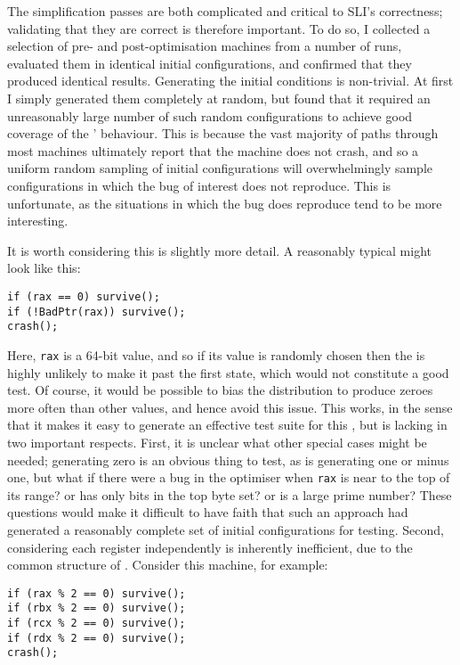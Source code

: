 The \StateMachine simplification passes are both complicated and
critical to SLI's correctness; validating that they are correct is
therefore important.  To do so, I collected a selection of pre- and
post-optimisation machines from a number of runs, evaluated them in
identical initial configurations, and confirmed that they produced
identical results.  Generating the initial conditions is non-trivial.
At first I simply generated them completely at random, but found that
it required an unreasonably large number of such random configurations
to achieve good coverage of the \StateMachines' behaviour.  This is
because the vast majority of paths through most machines ultimately
report that the machine does not crash, and so a uniform random
sampling of initial configurations will overwhelmingly sample
configurations in which the bug of interest does not reproduce.  This
is unfortunate, as the situations in which the bug does reproduce tend
to be more interesting.

It is worth considering this is slightly more detail.  A reasonably
typical \StateMachine might look like this:

\begin{verbatim}
if (rax == 0) survive();
if (!BadPtr(rax)) survive();
crash();
\end{verbatim}

Here, \verb|rax| is a 64-bit value, and so if its value is randomly
chosen then the \StateMachine is highly unlikely to make it past the
first state, which would not constitute a good test.  Of course, it
would be possible to bias the distribution to produce zeroes more
often than other values, and hence avoid this issue.  This works, in
the sense that it makes it easy to generate an effective test suite
for this \StateMachine, but is lacking in two important respects.
First, it is unclear what other special cases might be needed;
generating zero is an obvious thing to test, as is generating one or
minus one, but what if there were a bug in the optimiser when
\verb|rax| is near to the top of its range?  or has only bits in the
top byte set?  or is a large prime number?  These questions would make
it difficult to have faith that such an approach had generated a
reasonably complete set of initial configurations for testing.
Second, considering each register independently is inherently
inefficient, due to the common structure of \StateMachines.  Consider
this machine, for example:

\begin{verbatim}
if (rax % 2 == 0) survive();
if (rbx % 2 == 0) survive();
if (rcx % 2 == 0) survive();
if (rdx % 2 == 0) survive();
crash();
\end{verbatim}

